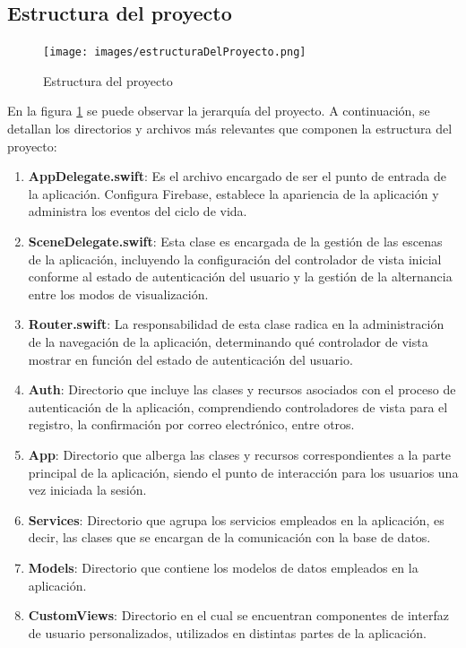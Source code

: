 \subsection{Estructura del proyecto}
\begin{figure}[H]
        \centering
        \texttt{[image: images/estructuraDelProyecto.png]}
        \caption{Estructura del proyecto}
        \label{fig:estructuraProyecto}
\end{figure}
En la figura \ref{fig:estructuraProyecto} se puede observar la jerarquía del proyecto. A continuación, se detallan los directorios y archivos más relevantes que componen la estructura del proyecto:

\begin{enumerate}
        \item \textbf{AppDelegate.swift}: Es el archivo encargado de ser el punto de entrada de la aplicación. Configura Firebase, establece la apariencia de la aplicación y administra los eventos del ciclo de vida.
        \item \textbf{SceneDelegate.swift}: Esta clase es encargada de la gestión de las escenas de la aplicación, incluyendo la configuración del controlador de vista inicial conforme al estado de autenticación del usuario y la gestión de la alternancia entre los modos de visualización.
        \item \textbf{Router.swift}: La responsabilidad de esta clase radica en la administración de la navegación de la aplicación, determinando qué controlador de vista mostrar en función del estado de autenticación del usuario.
        \item \textbf{Auth}: Directorio que incluye las clases y recursos asociados con el proceso de autenticación de la aplicación, comprendiendo controladores de vista para el registro, la confirmación por correo electrónico, entre otros.
        \item \textbf{App}: Directorio que alberga las clases y recursos correspondientes a la parte principal de la aplicación, siendo el punto de interacción para los usuarios una vez iniciada la sesión.
        \item \textbf{Services}: Directorio que agrupa los servicios empleados en la aplicación, es decir, las clases que se encargan de la comunicación con la base de datos.
        \item \textbf{Models}: Directorio que contiene los modelos de datos empleados en la aplicación.
        \item \textbf{CustomViews}: Directorio en el cual se encuentran componentes de interfaz de usuario personalizados, utilizados en distintas partes de la aplicación.

\end{enumerate}
